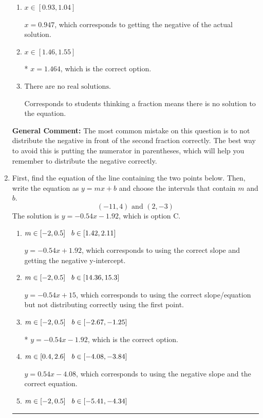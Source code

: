 \documentclass{extbook}[14pt]
\newcommand{\litem}[1]{\item #1

\rule{\textwidth}{0.4pt}}
\begin{document}
\begin{enumerate}
{\begin{enumerate}[label=\Alph*.]
$x = -1.286$, which corresponds to not distributing the negative in front of the second parentheses correctly.
\item \( x \in [0.93, 1.04] \)

$x = 0.947$, which corresponds to getting the negative of the actual solution.
\item \( x \in [1.46, 1.55] \)

* $x = 1.464$, which is the correct option.
\item \( \text{There are no real solutions.} \)

Corresponds to students thinking a fraction means there is no solution to the equation.
\end{enumerate}

\textbf{General Comment:} The most common mistake on this question is to not distribute the negative in front of the second fraction correctly. The best way to avoid this is putting the numerator in parentheses, which will help you remember to distribute the negative correctly.
}
\litem{
First, find the equation of the line containing the two points below. Then, write the equation as $ y=mx+b $ and choose the intervals that contain $m$ and $b$.
\[ (-11, 4) \text{ and } (2, -3) \]
The solution is \( y = -0.54x -1.92 \), which is option C.\begin{enumerate}[label=\Alph*.]
\item \( m \in [-2, 0.5] \hspace*{3mm} b \in [1.42, 2.11] \)

 $y = -0.54x + 1.92$, which corresponds to using the correct slope and getting the negative y-intercept.
\item \( m \in [-2, 0.5] \hspace*{3mm} b \in [14.36, 15.3] \)

 $y = -0.54x + 15$, which corresponds to using the correct slope/equation but not distributing correctly using the first point.
\item \( m \in [-2, 0.5] \hspace*{3mm} b \in [-2.67, -1.25] \)

* $y = -0.54x -1.92$, which is the correct option.
\item \( m \in [0.4, 2.6] \hspace*{3mm} b \in [-4.08, -3.84] \)

 $y = 0.54x -4.08$, which corresponds to using the negative slope and the correct equation.
\item \( m \in [-2, 0.5] \hspace*{3mm} b \in [-5.41, -4.34] \)


\end{enumerate}}
\end{enumerate}
\end{document}
